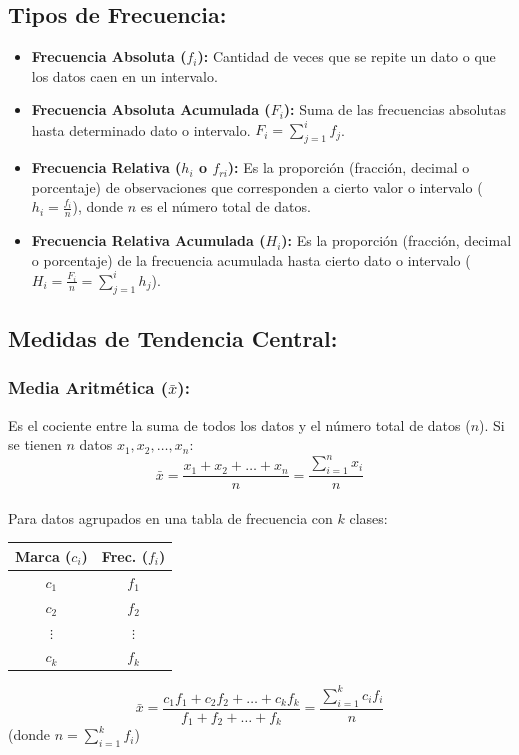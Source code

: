 \documentclass[12pt, letterpaper]{article}
\begin{document}
\subsection{Tipos de Frecuencia:}
\begin{itemize}
	\item \textbf{Frecuencia Absoluta ($f_i$):} Cantidad de veces que se repite un dato o que los datos caen en un intervalo.
	\item \textbf{Frecuencia Absoluta Acumulada ($F_i$):} Suma de las frecuencias absolutas hasta determinado dato o intervalo. $F_i = \sum_{j=1}^{i} f_j$.
	\item \textbf{Frecuencia Relativa ($h_i$ o $f_{ri}$):} Es la proporción (fracción, decimal o porcentaje) de observaciones que corresponden a cierto valor o intervalo ($h_i = \frac{f_i}{n}$), donde $n$ es el número total de datos.
	\item \textbf{Frecuencia Relativa Acumulada ($H_i$):} Es la proporción (fracción, decimal o porcentaje) de la frecuencia acumulada hasta cierto dato o intervalo ($H_i = \frac{F_i}{n} = \sum_{j=1}^{i} h_j$).
\end{itemize}
\newpage

\subsection{Medidas de Tendencia Central:}
\subsubsection{\texorpdfstring{Media Aritmética ($\bar{x}$):}{Media Aritmética (x barra)}}
Es el cociente entre la suma de todos los datos y el número total de datos ($n$). Si se tienen $n$ datos $x_1, x_2, \dots, x_n$:
\[ \bar{x}=\frac{x_1+x_2+\dots+x_n}{n} = \frac{\sum_{i=1}^{n} x_i}{n} \] \\
Para datos agrupados en una tabla de frecuencia con $k$ clases:
\begin{center}
	\begin{minipage}{0.35\textwidth}
		\centering
		\begin{tabular}{|c|c|}
			\hline
			\textbf{Marca ($c_i$)} & \textbf{Frec. ($f_i$)} \\
			\hline
			$c_1$                  & $f_1$                  \\ \hline
			$c_2$                  & $f_2$                  \\ \hline
			$\vdots$               & $\vdots$               \\ \hline
			$c_k$                  & $f_k$                  \\
			\hline
		\end{tabular}
	\end{minipage}
	\hfill
	\begin{minipage}{0.55\textwidth}
		\centering
		\[ \bar{x}=\frac{c_1 f_1 + c_2 f_2 + \dots + c_k f_k}{f_1+f_2+\dots+f_k} = \frac{\sum_{i=1}^{k} c_i f_i}{n} \]
		(donde $n = \sum_{i=1}^{k} f_i$)
	\end{minipage}
\end{center}
\end{document}
